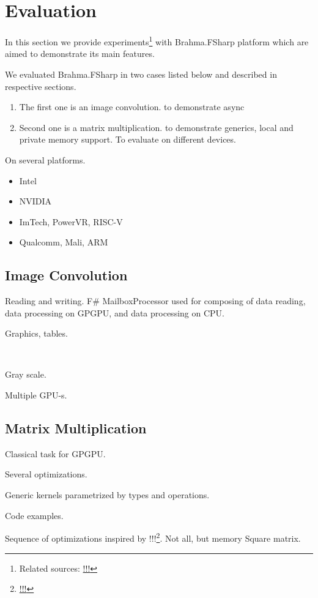 \section{Evaluation}

In this section we provide experiments\footnote{Related sources: \url{!!!}} with Brahma.FSharp platform which are aimed to demonstrate its main features.

We evaluated Brahma.FSharp in two cases listed below and described in respective sections.
\begin{enumerate}
\item The first one is an image convolution.  to demonstrate async
\item Second one is a matrix multiplication.  to demonstrate generics, local and private memory support. To evaluate on different devices.
\end{enumerate}

On several platforms.
\begin{itemize}
  \item Intel
  \item NVIDIA
  \item ImTech, PowerVR, RISC-V
  \item Qualcomm, Mali, ARM
\end{itemize}

\subsection{Image Convolution}

Reading and writing.
F\# MailboxProcessor  used for composing of data reading, data processing on GPGPU, and data processing on CPU.

Graphics, tables.


~\cite{aleaGPUasync}

Gray scale.

Multiple GPU-s.

\subsection{Matrix Multiplication}

Classical task for GPGPU.

Several optimizations.

Generic kernels parametrized by types and operations. 

Code examples.

Sequence of optimizations inspired by !!!\footnote{\url{!!!}}.  
Not all, but memory
Square matrix. 

